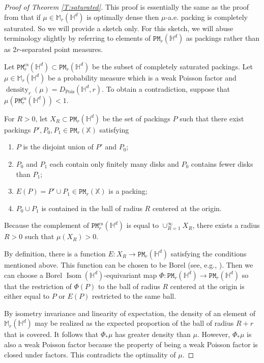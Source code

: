 \documentclass[11pt]{amsart}
\theoremstyle{definition}
\theoremstyle{remark}
\renewcommand{\H}{\mathbb{H}}
\newcommand{\M}{\mathbb{M}}
\newcommand{\bX}{\mathbb{X}}
\newcommand{\cP}{\mathtt{PM}}
\newcommand{\Isom}{\operatorname{Isom}}
\newcommand{\density}{\operatorname{density}}
\newcommand{\Pois}{\operatorname{Pois}}
\begin{document}
\begin{proof}[Proof of Theorem \ref{T:saturated}]
This proof is essentially the same as the proof from \cite[Theorem 3.1]{bowen2003existence} that if $\mu \in \M_r(\H^d)$ is optimally dense then $\mu$-a.e. packing is completely saturated. So we will provide a sketch only. For this sketch, we will abuse terminology slightly by referring to elements of $\cP_r(\H^d)$ as packings rather than as $2r$-separated point measures.


Let $\cP^{\mathrm{cs}}_r(\H^d) \subset \cP_r(\H^d)$ be the subset of completely saturated packings. Let $\mu \in \M_r(\H^d)$ be a probability measure which is a weak Poisson factor and $\density_r(\mu)=D_{\Pois}(\H^d,r)$. To obtain a contradiction, suppose that $\mu(\cP^{\mathrm{cs}}_r(\H^d))<1$. 


For $R>0$, let $X_R \subset \cP_r(\H^d)$ be the set of packings $P$ such that there exist  packings $P',P_0,P_1 \in \cP_r(\bX)$ satisfying
\begin{enumerate}
    \item $P$ is the disjoint union of $P'$ and $P_0$;
    \item $P_0$ and $P_1$ each contain only finitely many disks and $P_0$ contains fewer disks than $P_1$; 
    \item $E(P)=P' \cup P_1 \in \cP_r(\bX)$ is a packing;
    \item $P_0\cup P_1$ is contained in the ball of radius $R$ centered at the origin. 
\end{enumerate}
Because the complement of $\cP^{\mathrm{cs}}_r(\H^d)$ is equal to $\cup_{R=1}^\infty X_R$, there exists a radius $R>0$ such that $\mu(X_R)>0$. 

By definition, there is a function $E:X_R \to \cP_r(\H^d)$ satisfying the conditions mentioned above. This function can be chosen to be Borel (see, e.g., \cite[Lemma 4.1]{bowen2003existence}). Then we can choose a Borel $\Isom(\H^d)$-equivariant map $\Phi:\cP_r(\H^d) \to \cP_r(\H^d)$ so that the restriction of $\Phi(P)$ to the ball of radius $R$ centered at the origin is either equal to $P$ or $E(P)$ restricted to the same ball. 


By isometry invariance and linearity of expectation, the density of an element of $\M_r(\H^d)$ may be realized as the expected proportion of the ball of radius $R + r$ that is covered. It follows that $\Phi_*\mu$ has greater density than $\mu$. However, $\Phi_*\mu$ is also a weak Poisson factor because the property of being a weak Poisson factor is closed under factors. This contradicts the optimality of $\mu$.
\end{proof}
\end{document}
